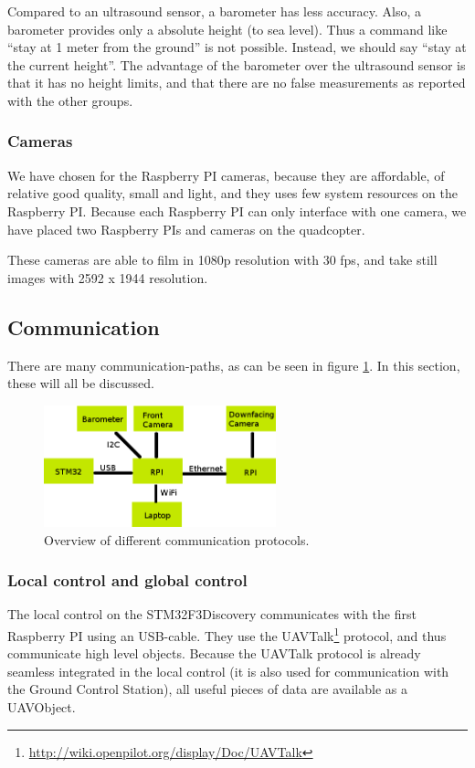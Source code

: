\documentclass[11pt, a4paper, onecolumn, oneside, parskip=half]{scrartcl}
\begin{document}
Compared to an ultrasound sensor, a barometer has less accuracy. Also, a barometer provides only a absolute height (to sea level). Thus a command like ``stay at 1 meter from the ground'' is not possible. Instead, we should say ``stay at the current height''. The advantage of the barometer over the ultrasound sensor is that it has no height limits, and that there are no false measurements as reported with the other groups.

\subsubsection{Cameras}
\label{sec:arch:sensors:cameras}
We have chosen for the Raspberry PI cameras, because they are affordable, of relative good quality, small and light, and they uses few system resources on the Raspberry PI. Because each Raspberry PI can only interface with one camera, we have placed two Raspberry PIs and cameras on the quadcopter.

These cameras are able to film in 1080p resolution with 30 fps, and take still images with 2592 x 1944 resolution.

\subsection{Communication}
\label{sec:arch:comm}
There are many communication-paths, as can be seen in figure \ref{fig:communication}. In this section, these will all be discussed.

\begin{figure}[ht]
\centering
\includegraphics[width=0.6\textwidth]{hwdesign2}
\caption{Overview of different communication protocols.}
\label{fig:communication}
\end{figure}

\subsubsection{Local control and global control}
\label{sec:arch:comm:localglobal}
The local control on the STM32F3Discovery communicates with the first Raspberry PI using an USB-cable. They use the UAVTalk\footnote{\url{http://wiki.openpilot.org/display/Doc/UAVTalk}} protocol, and thus communicate high level objects. Because the UAVTalk protocol is already seamless integrated in the local control (it is also used for communication with the Ground Control Station), all useful pieces of data are available as a UAVObject.
\end{document}
